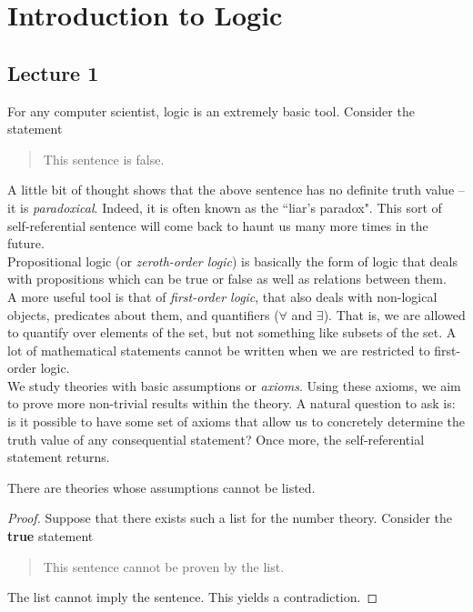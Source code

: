 \section{Introduction to Logic}

\subsection{Lecture 1}

For any computer scientist, logic is an extremely basic tool. Consider the statement
\begin{quote}
	This sentence is false.
\end{quote}
A little bit of thought shows that the above sentence has no definite truth value -- it is \textit{paradoxical}. Indeed, it is often known as the ``liar's paradox". This sort of self-referential sentence will come back to haunt us many more times in the future.\\

Propositional logic (or \textit{zeroth-order logic}) is basically the form of logic that deals with propositions which can be true or false as well as relations between them.\\
A more useful tool is that of \textit{first-order logic}, that also deals with non-logical objects, predicates about them, and quantifiers ($\forall$ and $\exists$). That is, we are allowed to quantify over elements of the set, but not something like subsets of the set. A lot of mathematical statements cannot be written when we are restricted to first-order logic.\\

We study theories with basic assumptions or \textit{axioms}. Using these axioms, we aim to prove more non-trivial results within the theory. A natural question to ask is: is it possible to have some set of axioms that allow us to concretely determine the truth value of any consequential statement? Once more, the self-referential statement returns.

\begin{theorem}
There are theories whose assumptions cannot be listed.
\end{theorem}
\begin{proof}
Suppose that there exists such a list for the number theory. Consider the \textbf{true} statement
\begin{quote}
	This sentence cannot be proven by the list.
\end{quote}
The list cannot imply the sentence. This yields a contradiction.
\end{proof}

